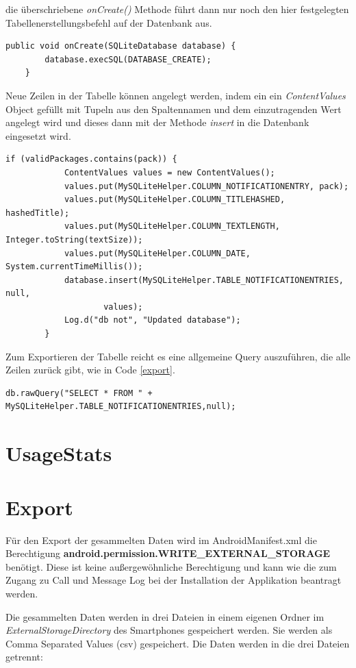 die überschriebene \emph{onCreate()} Methode führt dann nur noch den hier festgelegten Tabellenerstellungsbefehl auf der Datenbank aus.

\begin{lstlisting}[frame=single, caption = onCreate Methode, label=databaseoncreate] 
  public void onCreate(SQLiteDatabase database) {
        database.execSQL(DATABASE_CREATE);
    } 
\end{lstlisting}

Neue Zeilen in der Tabelle können angelegt werden, indem ein ein \emph{ContentValues} Object gefüllt 
mit Tupeln aus den Spaltennamen und dem einzutragenden Wert angelegt wird und dieses dann mit der Methode \emph{insert} in die Datenbank eingesetzt wird.

\begin{lstlisting}[frame=single, caption = Einfügen in die Datenbank, label=databaseinsert] 
if (validPackages.contains(pack)) {
            ContentValues values = new ContentValues();
            values.put(MySQLiteHelper.COLUMN_NOTIFICATIONENTRY, pack);
            values.put(MySQLiteHelper.COLUMN_TITLEHASHED, hashedTitle);
            values.put(MySQLiteHelper.COLUMN_TEXTLENGTH, Integer.toString(textSize));
            values.put(MySQLiteHelper.COLUMN_DATE, System.currentTimeMillis());
            database.insert(MySQLiteHelper.TABLE_NOTIFICATIONENTRIES, null,
                    values);
            Log.d("db not", "Updated database");
        }
\end{lstlisting}

Zum Exportieren der Tabelle reicht es eine allgemeine Query auszuführen, die alle Zeilen zurück gibt, wie in Code \ref{export}.

\begin{lstlisting}[frame=single, caption = Einfügen in die Datenbank, label=databaseexport] 
  db.rawQuery("SELECT * FROM " + MySQLiteHelper.TABLE_NOTIFICATIONENTRIES,null); 
\end{lstlisting}

\section{UsageStats}

\section{Export}

Für den Export der gesammelten Daten wird im AndroidManifest.xml die Berechtigung \textbf{android.permission.WRITE\_EXTERNAL\_STORAGE}
benötigt. 
Diese ist keine außergewöhnliche Berechtigung und kann wie die zum Zugang zu Call und Message Log bei der Installation der Applikation beantragt werden.
\par
Die gesammelten Daten werden in drei Dateien in einem eigenen Ordner im \emph{ExternalStorageDirectory} des Smartphones gespeichert werden.
Sie werden als Comma Separated Values (csv) gespeichert.
Die Daten werden in die drei Dateien getrennt:

